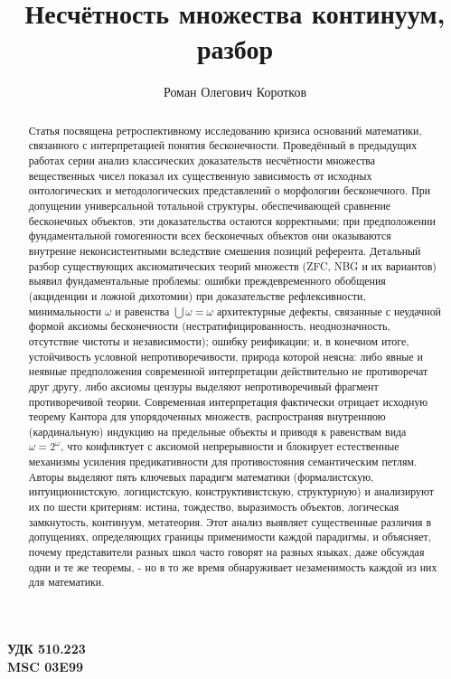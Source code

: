 \documentclass[12pt]{article}
\title{Несчётность множества континуум, разбор}
\author{Роман Олегович Коротков}
\begin{document}
 

\begin{flushleft}
{\bf УДК 510.223 }\\{\bf MSC 03E99 }
\end{flushleft}

{\let\newpage\relax\maketitle}

\begin{abstract}

Статья посвящена ретроспективному исследованию кризиса оснований математики, связанного с интерпретацией понятия бесконечности. Проведённый в предыдущих работах серии анализ классических доказательств несчётности множества вещественных чисел показал их существенную зависимость от исходных онтологических и методологических представлений о морфологии бесконечного. При допущении универсальной тотальной структуры, обеспечивающей сравнение бесконечных объектов, эти доказательства остаются корректными; при предположении фундаментальной гомогенности всех бесконечных объектов они оказываются внутренне неконсистентными вследствие смешения позиций референта. Детальный разбор существующих аксиоматических теорий множеств (ZFC, NBG и их вариантов) выявил фундаментальные проблемы: ошибки преждевременного обобщения (акциденции и ложной дихотомии) при доказательстве рефлексивности, минимальности $\omega$ и равенства $\bigcup \omega = \omega$ архитектурные дефекты, связанные с неудачной формой аксиомы бесконечности (нестратифицированность, неоднозначность, отсутствие чистоты и независимости); ошибку реификации; и, в конечном итоге, устойчивость условной непротиворечивости, природа которой неясна: либо явные и неявные предположения современной интерпретации действительно не противоречат друг другу, либо аксиомы цензуры выделяют непротиворечивый фрагмент противоречивой теории. Современная интерпретация фактически отрицает исходную теорему Кантора для упорядоченных множеств, распространяя внутреннюю (кардинальную) индукцию на предельные объекты и приводя к равенствам вида $\omega = 2^\omega$, что конфликтует с аксиомой непрерывности и блокирует естественные механизмы усиления предикативности для противостояния семантическим петлям. Авторы выделяют пять ключевых парадигм математики (формалистскую, интуиционистскую, логицистскую, конструктивистскую, структурную) и анализируют их по шести критериям: истина, тождество, выразимость объектов, логическая замкнутость, континуум, метатеория. Этот анализ выявляет существенные различия в допущениях, определяющих границы применимости каждой парадигмы, и объясняет, почему представители разных школ часто говорят на разных языках, даже обсуждая одни и те же теоремы, - но в то же время обнаруживает незаменимость каждой из них для математики.


\end{abstract}
\end{document}

